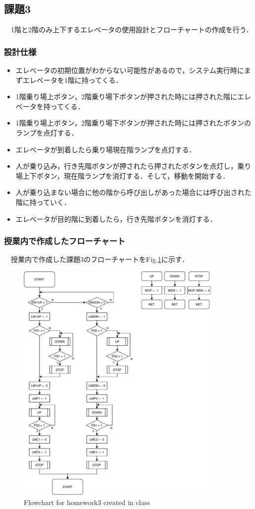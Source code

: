 \subsection{課題3}
　1階と2階のみ上下するエレベータの使用設計とフローチャートの作成を行う．

\subsubsection{設計仕様}
\begin{itemize}
    \item エレベータの初期位置がわからない可能性があるので，システム実行時にまずエレベータを1階に持ってくる．
    \item 1階乗り場上ボタン，2階乗り場下ボタンが押された時には押された階にエレベータを持ってくる．
    \item 1階乗り場上ボタン，2階乗り場下ボタンが押された時には押されたボタンのランプを点灯する．
    \item エレベータが到着したら乗り場現在階ランプを点灯する．
    \item 人が乗り込み，行き先階ボタンが押されたら押されたボタンを点灯し，乗り場上下ボタン，現在階ランプを消灯する．そして，移動を開始する．
    \item 人が乗り込まない場合に他の階から呼び出しがあった場合には呼び出された階に持っていく．
    \item エレベータが目的階に到着したら，行き先階ボタンを消灯する．
\end{itemize}

\subsubsection{授業内で作成したフローチャート}
　授業内で作成した課題3のフローチャートをFig.\ref{fig:kadai3_before}に示す．
\begin{figure}[H]
    \centering
    \includegraphics[width=10cm]{./fig/kadai3_before.pdf}
    \caption{Flowchart for homework3 created in class}
    \label{fig:kadai3_before}
\end{figure}

